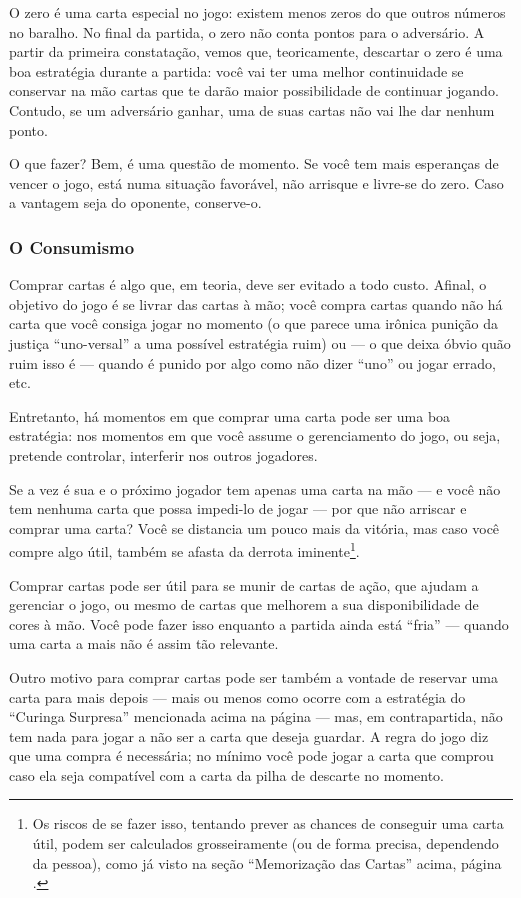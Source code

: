 O zero é uma carta especial no jogo: existem menos zeros do que outros números no baralho. No final da partida, o zero não conta pontos para o adversário. A partir da primeira constatação, vemos que, teoricamente, descartar o zero é uma boa estratégia durante a partida: você vai ter uma melhor continuidade se conservar na mão cartas que te darão maior possibilidade de continuar jogando. Contudo, se um adversário ganhar, uma de suas cartas não vai lhe dar nenhum ponto.

O que fazer? Bem, é uma questão de momento. Se você tem mais esperanças de vencer o jogo, está numa situação favorável, não arrisque e livre-se do zero. Caso a vantagem seja do oponente, conserve-o.

\subsubsection{O Consumismo}

Comprar cartas é algo que, em teoria, deve ser evitado a todo custo. Afinal, o objetivo do jogo é se livrar das cartas à mão; você compra cartas quando não há carta que você consiga jogar no momento (o que parece uma irônica punição da justiça ``uno-versal'' a uma possível estratégia ruim) ou --- o que deixa óbvio quão ruim isso é --- quando é punido por algo como não dizer ``uno'' ou jogar errado, etc.

Entretanto, há momentos em que comprar uma carta pode ser uma boa estratégia: nos momentos em que você assume o gerenciamento do jogo, ou seja, pretende controlar, interferir nos outros jogadores.

Se a vez é sua e o próximo jogador tem apenas uma carta na mão --- e você não tem nenhuma carta que possa impedi-lo de jogar --- por que não arriscar e comprar uma carta? Você se distancia um pouco mais da vitória, mas caso você compre algo útil, também se afasta da derrota iminente\footnote{Os riscos de se fazer isso, tentando prever as chances de conseguir uma carta útil, podem ser calculados grosseiramente (ou de forma precisa, dependendo da pessoa), como já visto na seção ``Memorização das Cartas'' acima, página \pageref{memorizacaodascartas}.}.

Comprar cartas pode ser útil para se munir de cartas de ação, que ajudam a gerenciar o jogo, ou mesmo de cartas que melhorem a sua disponibilidade de cores à mão. Você pode fazer isso enquanto a partida ainda está ``fria'' --- quando uma carta a mais não é assim tão relevante.

Outro motivo para comprar cartas pode ser também a vontade de reservar uma carta para mais depois --- mais ou menos como ocorre com a estratégia do ``Curinga Surpresa'' mencionada acima na página \pageref{curingasurpresa} --- mas, em contrapartida, não tem nada para jogar a não ser a carta que deseja guardar. A regra do jogo diz que uma compra é necessária; no mínimo você pode jogar a carta que comprou caso ela seja compatível com a carta da pilha de descarte no momento.


